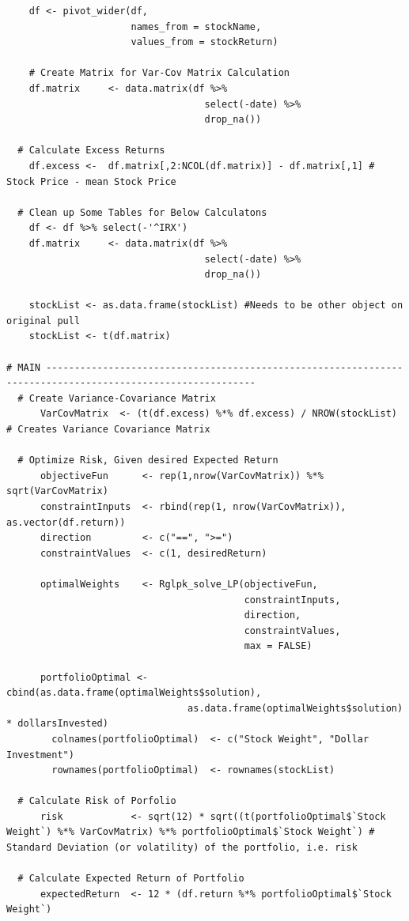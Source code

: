 \documentclass[12pt,english]{article}
\begin{document}
\begin{lstlisting}
    df <- pivot_wider(df, 
                      names_from = stockName, 
                      values_from = stockReturn)
    
    # Create Matrix for Var-Cov Matrix Calculation
    df.matrix     <- data.matrix(df %>% 
                                   select(-date) %>%
                                   drop_na())
    
  # Calculate Excess Returns
    df.excess <-  df.matrix[,2:NCOL(df.matrix)] - df.matrix[,1] # Stock Price - mean Stock Price
    
  # Clean up Some Tables for Below Calculatons
    df <- df %>% select(-'^IRX')
    df.matrix     <- data.matrix(df %>% 
                                   select(-date) %>%
                                   drop_na())
    
    stockList <- as.data.frame(stockList) #Needs to be other object on original pull  
    stockList <- t(df.matrix)
    
# MAIN -----------------------------------------------------------------------------------------------------------
  # Create Variance-Covariance Matrix
      VarCovMatrix  <- (t(df.excess) %*% df.excess) / NROW(stockList) # Creates Variance Covariance Matrix
  
  # Optimize Risk, Given desired Expected Return
      objectiveFun      <- rep(1,nrow(VarCovMatrix)) %*% sqrt(VarCovMatrix)
      constraintInputs  <- rbind(rep(1, nrow(VarCovMatrix)), as.vector(df.return))
      direction         <- c("==", ">=")
      constraintValues  <- c(1, desiredReturn)
      
      optimalWeights    <- Rglpk_solve_LP(objectiveFun,
                                          constraintInputs,
                                          direction,
                                          constraintValues,
                                          max = FALSE)
    
      portfolioOptimal <- cbind(as.data.frame(optimalWeights$solution),
                                as.data.frame(optimalWeights$solution) * dollarsInvested)
        colnames(portfolioOptimal)  <- c("Stock Weight", "Dollar Investment")
        rownames(portfolioOptimal)  <- rownames(stockList)

  # Calculate Risk of Porfolio
      risk            <- sqrt(12) * sqrt((t(portfolioOptimal$`Stock Weight`) %*% VarCovMatrix) %*% portfolioOptimal$`Stock Weight`) # Standard Deviation (or volatility) of the portfolio, i.e. risk
      
  # Calculate Expected Return of Portfolio
      expectedReturn  <- 12 * (df.return %*% portfolioOptimal$`Stock Weight`)
  

\end{lstlisting}
\end{document}
